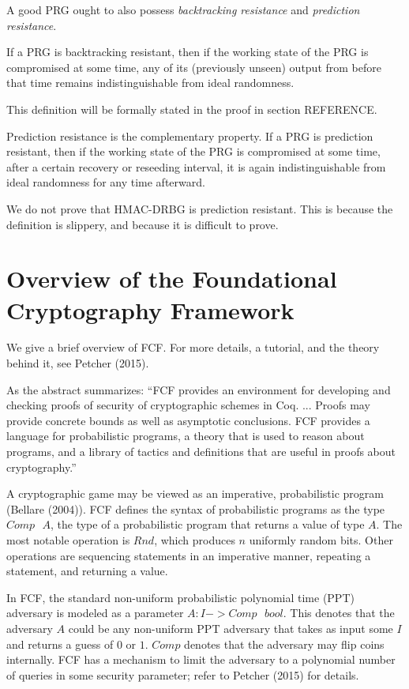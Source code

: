 \documentclass[12pt,lot, lof]{puthesis}
\newcommand{\s} {\textrm{ }}
\begin{document}
A good PRG ought to also possess \emph{backtracking resistance} and \emph{prediction resistance}.

If a PRG is backtracking resistant, then if the working state of the PRG is compromised at some time, any of its (previously unseen) output from before that time remains indistinguishable from ideal randomness.

This definition will be formally stated in the proof in section REFERENCE.

Prediction resistance is the complementary property. If a PRG is prediction resistant, then if the working state of the PRG is compromised at some time, after a certain recovery or reseeding interval, it is again indistinguishable from ideal randomness for any time afterward.


We do not prove that HMAC-DRBG is prediction resistant. This is because the definition is slippery, and because it is difficult to prove.

\section{Overview of the Foundational Cryptography Framework} \label{sec:overview_of_the_foundational_cryptography_framework}

We give a brief overview of FCF. For more details, a tutorial, and the theory behind it, see Petcher (2015).

As the abstract summarizes: ``FCF provides an environment for developing and checking proofs of security of cryptographic schemes in Coq. ...  Proofs may provide concrete bounds as well as asymptotic conclusions. FCF provides a language for probabilistic programs, a theory that is used to reason about programs, and a library of tactics and definitions that are useful in proofs about cryptography.'' 

A cryptographic game may be viewed as an imperative, probabilistic program (Bellare (2004)). FCF defines the syntax of probabilistic programs as the type $Comp \s A$, the type of a probabilistic program that returns a value of type $A$. The most notable operation is $Rnd$, which produces $n$ uniformly random bits. Other operations are sequencing statements in an imperative manner, repeating a statement, and returning a value.

In FCF, the standard non-uniform probabilistic polynomial time (PPT) adversary is modeled as a parameter $A : I -> Comp \s bool$. This denotes that the adversary $A$ could be any non-uniform PPT adversary that takes as input some $I$ and returns a guess of $0$ or $1$. $Comp$ denotes that the adversary may flip coins internally. FCF has a mechanism to limit the adversary to a polynomial number of queries in some security parameter; refer to Petcher (2015) for details.
\end{document}
